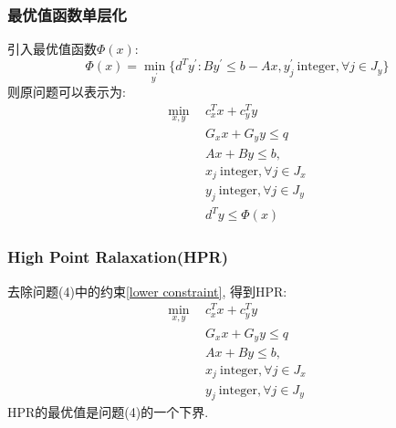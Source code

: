 \documentclass[10pt]{beamer}
\begin{document}
\begin{frame}
	\frametitle{最优值函数单层化}
	引入最优值函数$\Phi(x)$:
	\begin{equation}
		\Phi(x)=\operatorname*{min}_{y^{\prime}}\{d^{T}y^{\prime}:By^{\prime}\le b-Ax,y_{j}^{\prime}\mathrm{~integer}, \forall j\in J_{y}\}
	\end{equation}
	则原问题可以表示为:
	\begin{subequations}
		\begin{align}
			\min_{x,y}~~&c_{x}^{T}x+c_{y}^{T}y \\
			&G_xx+G_yy \leq q  \\
			&Ax+By\leq b,\\
			&x_{j}\mathrm{~integer}, \forall j\in J_{x}  \\
			&y_{j}\mathrm{~integer}, \forall j\in J_{y}  \\
			&d^{T}y\leq \Phi(x)	\label{lower constraint}
		\end{align}
	\end{subequations}

\end{frame}

\begin{frame}
	\frametitle{High Point Ralaxation(HPR)}
	去除问题(4)中的约束\eqref{lower constraint}, 得到HPR:
	\begin{subequations}
		\begin{align}
			\min_{x,y}~~&c_{x}^{T}x+c_{y}^{T}y \\
			&G_xx+G_yy \leq q  \\
			&Ax+By\leq b,\\
			&x_{j}\mathrm{~integer}, \forall j\in J_{x}  \\
			&y_{j}\mathrm{~integer}, \forall j\in J_{y}
		\end{align}
	\end{subequations}
	HPR的最优值是问题(4)的一个下界.
\end{frame}
\end{document}
